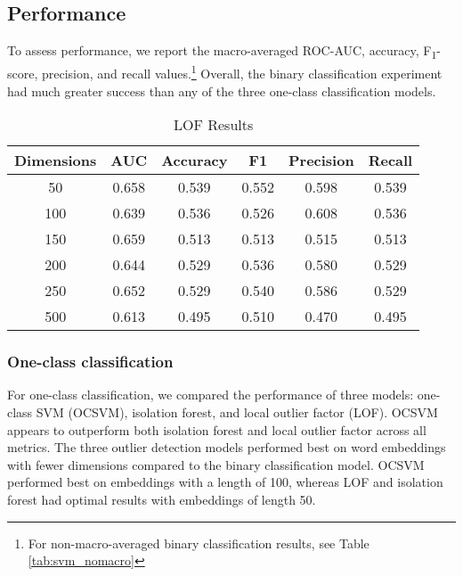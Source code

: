 \documentclass{article}
\begin{document}
\hypertarget{performance}{%
\subsection{Performance}\label{performance}}

To assess performance, we report the macro-averaged ROC-AUC, accuracy,
F\textsubscript{1}-score, precision, and recall values.\footnote{For
  non-macro-averaged binary classification results, see Table
  \ref{tab:svm_nomacro}} Overall, the binary classification experiment
had much greater success than any of the three one-class classification
models.

\begin{table}
 \caption{LOF Results}
  \centering
  \begin{tabular}{|c|c|c|c|c|c|}
    \hline
    \rowcolor{lightgray} \textbf{Dimensions} & \textbf{AUC} & \textbf{Accuracy} & \textbf{F1} & \textbf{Precision} & \textbf{Recall} \\
    \hline
    \cellcolor{green} 50 & 0.658 & \cellcolor{green} 0.539 & \cellcolor{green} 0.552 & 0.598 & \cellcolor{green} 0.539 \\
    \hline
    100 & 0.639 & 0.536 & 0.526 & \cellcolor{green} 0.608 & 0.536 \\
    \hline
    150 & \cellcolor{green} 0.659 & 0.513 & 0.513 & 0.515 & 0.513 \\
    \hline
    200 & 0.644 & 0.529 & 0.536 & 0.580 & 0.529 \\
    \hline
    250 & 0.652 & 0.529 & 0.540 & 0.586 & 0.529 \\
    \hline
    500 & 0.613 & 0.495 & 0.510 & 0.470 & 0.495 \\
    \hline
  \end{tabular}
  \label{tab:lof}
\end{table}

\hypertarget{one-class-classification}{%
\subsubsection{One-class
classification}\label{one-class-classification}}

For one-class classification, we compared the performance of three
models: one-class SVM (OCSVM), isolation forest, and local outlier
factor (LOF). OCSVM appears to outperform both isolation forest and
local outlier factor across all metrics. The three outlier detection
models performed best on word embeddings with fewer dimensions compared
to the binary classification model. OCSVM performed best on embeddings
with a length of 100, whereas LOF and isolation forest had optimal
results with embeddings of length 50.
\end{document}

